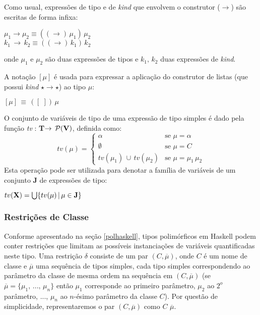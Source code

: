 Como usual,  express\~oes de tipo e de \emph{kind} que envolvem o construtor ($\rightarrow$) s\~ao escritas de forma 
infixa:
\begin{center}
	$\mu_{1}\rightarrow\mu_{2}\equiv ((\rightarrow)\,\mu_{1})\,\mu_{2}$\\
	$k_{1}\,\rightarrow\,k_{2}\equiv ((\rightarrow)\,k_{1})\,k_{2}$\\
\end{center}
onde $\mu_{1}$ e $\mu_{2}$ s\~ao duas express\~oes de tipos e $k_{1},\,k_{2}$ duas express\~oes de \emph{kind}.

A nota\c{c}\~ao $[\mu]$ \'e usada para expressar a aplica\c{c}\~ao do construtor de listas (que possui
 \emph{kind} $\star\rightarrow\star$) ao tipo $\mu$:
 \begin{center}
 	$[\mu]\,\equiv\,([\,\,])\,\mu$
 \end{center}
 
 O conjunto de vari\'aveis de tipo de uma express\~ao de tipo simples \'e dado pela fun\c{c}\~ao 
 \emph{tv} : \textbf{T}$\rightarrow\,\mathcal{P}(\text{\textbf{V}})$, definida como:
\begin{equation*}
	tv(\mu) = \left\{
		\begin{array}{ll}
			\alpha          & \text{se } \mu = \alpha\\
			\emptyset       & \text{se } \mu = C \\
			tv(\mu_{1})\, \cup\, tv(\mu_{2})& \text{se } \mu = \mu_{1}\,\mu_{2}
		\end{array} 
	           \right.
\end{equation*}
Esta opera\c{c}\~ao pode ser utilizada para denotar a fam\'ilia de vari\'aveis de um conjunto 
\textbf{J} de express\~oes de tipo:
\begin{center}
   $tv(\text{\textbf{X}})=\bigcup\{tv(\mu)\,|\,\mu\in\text{\textbf{J}}\}$
\end{center}

\subsubsection{Restri\c{c}\~oes de Classe}

Conforme apresentado na se\c{c}\~ao \ref{polhaskell}, tipos polim\'orficos em Haskell podem conter restri\c{c}\~oes
que limitam as poss\'iveis instancia\c{c}\~oes de vari\'aveis quantificadas neste tipo. Uma restri\c{c}\~ao $\delta$
consiste de um par $(C,\overline{\mu})$, onde $C$ \'e um nome de classe e $\overline{\mu}$ uma sequ\^encia 
de tipos simples, cada tipo simples correspondendo ao par\^ametro da classe de mesma ordem na sequ\^encia em 
$(C,\overline{\mu})$ (se $\overline{\mu}=\{\mu_{1},\,...,\,\mu_{n}\}$ ent\~ao $\mu_{1}$ corresponde ao primeiro 
par\^ametro, $\mu_{2}$ ao $2^{o}$ par\^ametro, ..., $\mu_{n}$ ao $n$-\'esimo par\^ametro da classe $C$). Por quest\~ao
de simplicidade, representaremos o par $(C,\overline{\mu})$ como $C\,\,\overline{\mu}$.

